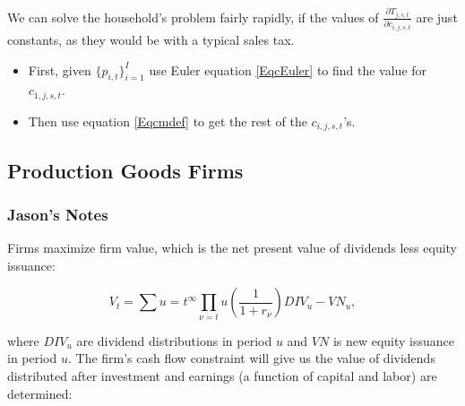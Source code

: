 \documentclass[letterpaper,12pt]{article}
\theoremstyle{definition}
\begin{document}
\begin{spacing}{1.5}



    We can solve the household's problem fairly rapidly, if the values of $\frac{\partial T_{j,s,t}}{\partial c_{i,j,s,t}}$ are just constants, as they would be with a typical sales tax.
    \begin{itemize}
    \item First, given $\{p_{i,t}\}_{i=1}^I$ use Euler equation \eqref{EqcEuler} to find the value for $c_{1,j,s,t}$.
    \item Then use equation \eqref{Eqcmdef} to get the rest of the $c_{i,j,s,t}$'s.
    \end{itemize}

  \subsection{Production Goods Firms}
    \subsubsection{Jason's Notes}
      Firms maximize firm value, which is the net present value of dividends less equity issuance:

      \begin{equation}
      \label{eqn:firm_value}
      V_{t} = \sum{u=t}^{\infty} \prod_{\nu=t}{u} \left(\frac{1}{1+r_{\nu}}\right) DIV_{u}-VN_{u},
      \end{equation}

      \noindent\noindent where $DIV_{u}$ are dividend distributions in period $u$ and $VN$ is new equity issuance in period $u$.  The firm's cash flow constraint will give us the value of dividends distributed after investment and earnings (a function of capital and labor) are determined:


\end{spacing}
\end{document}

